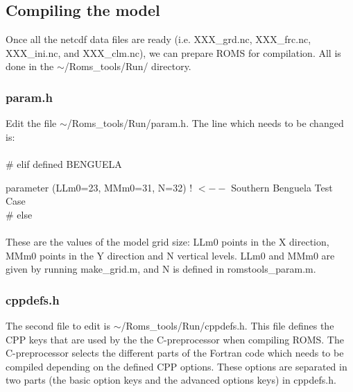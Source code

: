 \subsection{Compiling the model}

Once all the netcdf data files are ready (i.e. XXX\_grd.nc,
XXX\_frc.nc, XXX\_ini.nc, and XXX\_clm.nc), we can 
prepare ROMS for compilation. All is done in the 
 $\sim$/Roms\_tools/Run/ directory. 

\subsubsection{param.h}
Edit the file 
 $\sim$/Roms\_tools/Run/param.h.
 The line which needs to be changed is:\\\\
\#  elif defined BENGUELA

      parameter (LLm0=23, MMm0=31, N=32)  ! $<--$ Southern Benguela Test Case\\
\#  else\\
\\
These are the values of the model grid size: LLm0 points in the X 
direction, MMm0 points in the Y direction and N vertical levels.
LLm0 and MMm0 are given by running make\_grid.m, and N is
defined in romstools\_param.m.

\subsubsection{cppdefs.h}
The second file to edit is  $\sim$/Roms\_tools/Run/cppdefs.h.
This file defines the CPP keys that are used by the
the C-preprocessor when compiling ROMS. The C-preprocessor selects the different
parts of the Fortran code which needs to be compiled depending on the defined CPP
options. These options are separated in two parts (the basic option keys and
the advanced options keys) in cppdefs.h.\\

